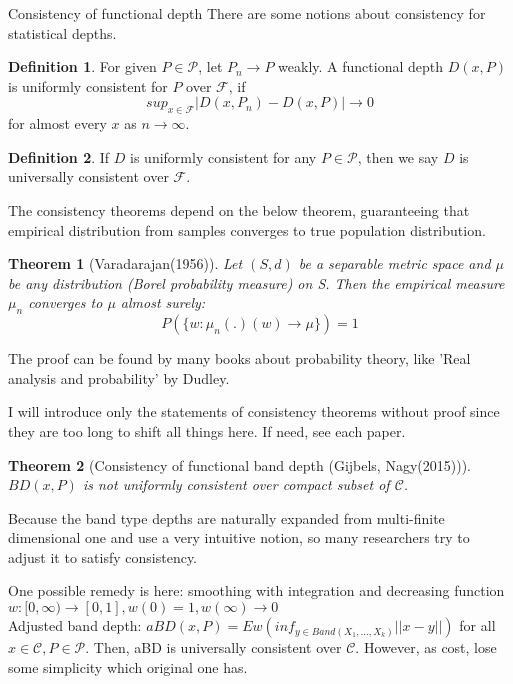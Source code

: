 \documentclass[aspectratio=169,ignorenonframetext,9pt]{beamer}
\theoremstyle{plain}
\newtheorem{thm}{Theorem}[section]
\theoremstyle{definition}
\newtheorem{defn}{Definition}[section]
\begin{document}
\begin{frame}{Consistency of functional depth}
There are some notions about consistency for statistical depths.

\begin{defn}
    For given $P\in\mathcal{P}$, let $P_n\rightarrow P$ weakly.
    A functional depth $D(x,P)$ is uniformly consistent for $P$ over $\mathcal{F}$,
    if
    \[sup_{x\in\mathcal{F}}|D(x,P_n)-D(x,P)|\rightarrow 0\]
    for almost every $x$ as $n\rightarrow\infty$.
\end{defn}
\begin{defn}
    If $D$ is uniformly consistent for any $P\in\mathcal{P}$,
    then we say $D$ is universally consistent over $\mathcal{F}$.
\end{defn}
    
The consistency theorems depend on the below theorem, guaranteeing that
empirical distribution from samples converges to true population distribution.
\begin{thm}[Varadarajan(1956)]
    Let $(S,d)$ be a separable metric space and $\mu$ be any distribution (Borel probability measure) on S.
    Then the empirical measure $\mu_n$ converges to $\mu$ almost surely:
    \[P(\{w:\mu_n(.)(w)\rightarrow\mu\})=1\]
\end{thm}
The proof can be found by many books about probability theory, like 'Real analysis and probability' by Dudley.


I will introduce only the statements of consistency theorems without proof since they are too long to shift all things here. 
If need, see each paper.

\begin{thm}[Consistency of functional band depth (Gijbels, Nagy(2015))]
    $BD(x,P)$ is not uniformly consistent over compact subset of $\mathcal{C}$.
\end{thm}

Because the band type depths are naturally expanded from multi-finite dimensional one and 
use a very intuitive notion, so many researchers try to adjust it to satisfy consistency.

One possible remedy is here: smoothing with integration and decreasing function $w:[0,\infty)\rightarrow[0,1],w(0)=1,w(\infty)\rightarrow 0$ \\
Adjusted band depth: \(aBD(x,P)=Ew(inf_{y\in Band(X_1,...,X_k)} ||x-y||)\) for all $x\in\mathcal{C},P\in\mathcal{P}$.
Then, aBD is universally consistent over $\mathcal{C}$. However, as cost, lose some simplicity which original one has.


\end{frame}
\end{document}
